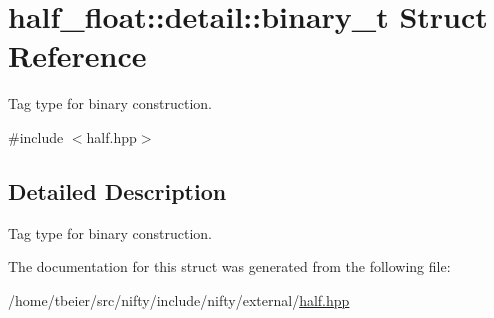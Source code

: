 \hypertarget{structhalf__float_1_1detail_1_1binary__t}{}\section{half\+\_\+float\+:\+:detail\+:\+:binary\+\_\+t Struct Reference}
\label{structhalf__float_1_1detail_1_1binary__t}


Tag type for binary construction.  




{\ttfamily \#include $<$half.\+hpp$>$}



\subsection{Detailed Description}
Tag type for binary construction. 

The documentation for this struct was generated from the following file\+:\begin{DoxyCompactItemize}
\item 
/home/tbeier/src/nifty/include/nifty/external/\hyperlink{half_8hpp}{half.\+hpp}\end{DoxyCompactItemize}
